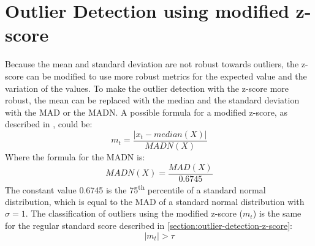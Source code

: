 \section{Outlier Detection using modified z-score}\label{section:outlier-detection-modified-z-score}
Because the mean and standard deviation are not robust towards outliers, the z-score can be modified to use more robust metrics for the expected value and the variation of the values. To make the outlier detection with the z-score more robust, the mean can be replaced with the median and the standard deviation with the \ac{MAD} or the \ac{MADN}. A possible formula for a modified z-score, as described in \cite{baeOutlierDetectionSmoothing2019}, could be:
\begin{equation}
  m_t = \frac{|x_t - median(X)|}{MADN(X)}
\end{equation}
Where the formula for the \ac{MADN} is:
\begin{equation}
  MADN(X) = \frac{MAD(X)}{0.6745}
\end{equation}
The constant value 0.6745 is the 75\textsuperscript{th} percentile of a standard normal distribution, which is equal to the \ac{MAD} of a standard normal distribution with $\sigma = 1$.
\cite{baeOutlierDetectionSmoothing2019}
\newline
The classification of outliers using the modified z-score ($m_t$) is the same for the regular standard score described in \autoref{section:outlier-detection-z-score}:
\begin{equation}
  |m_t| > \tau
\end{equation}


